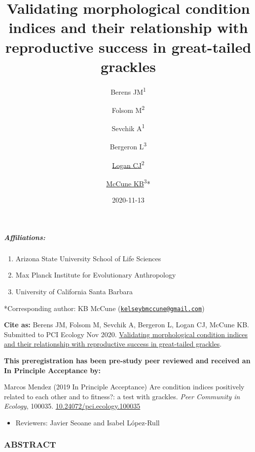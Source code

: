 \documentclass[
]{article}
\title{Validating morphological condition indices and their relationship with
reproductive success in great-tailed grackles}
\author{Berens JM\textsuperscript{1} \and Folsom M\textsuperscript{2} \and Sevchik A\textsuperscript{1} \and Bergeron L\textsuperscript{3} \and \href{http://CorinaLogan.com}{Logan CJ}\textsuperscript{2} \and \href{https://www.kelseymccune.com/}{McCune KB}\textsuperscript{3}*}
\date{2020-11-13}
\providecommand{\tightlist}{%
  \setlength{\itemsep}{0pt}\setlength{\parskip}{0pt}}
\begin{document}
\maketitle

\hypertarget{affiliations}{%
\subparagraph{Affiliations:}\label{affiliations}}

\begin{enumerate}
\def\labelenumi{\arabic{enumi})}
\tightlist
\item
  Arizona State University School of Life Sciences
\item
  Max Planck Institute for Evolutionary Anthropology
\item
  University of California Santa Barbara
\end{enumerate}

*Corresponding author: KB McCune
(\href{mailto:kelseybmccune@gmail.com}{\nolinkurl{kelseybmccune@gmail.com}})

\textbf{Cite as:} Berens JM, Folsom M, Sevchik A, Bergeron L, Logan CJ,
McCune KB. Submitted to PCI Ecology Nov 2020.
\href{http://corinalogan.com/Preregistrations/gcondition.html}{Validating
morphological condition indices and their relationship with reproductive
success in great-tailed grackles}.

\textbf{This preregistration has been pre-study peer reviewed and
received an In Principle Acceptance by:}

Marcos Mendez (2019 In Principle Acceptance) Are condition indices
positively related to each other and to fitness?: a test with grackles.
\emph{Peer Community in Ecology}, 100035.
\href{https://doi.org/10.24072/pci.ecology.100035}{10.24072/pci.ecology.100035}

\begin{itemize}
\tightlist
\item
  Reviewers: Javier Seoane and Isabel López-Rull
\end{itemize}

\hypertarget{abstract}{%
\subsubsection{ABSTRACT}\label{abstract}}
\end{document}
